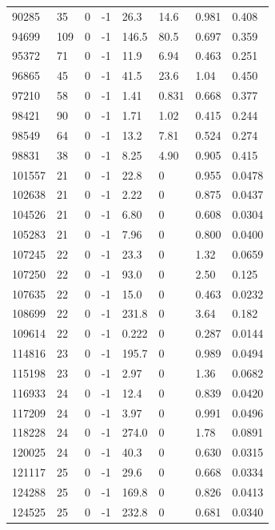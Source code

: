 \documentclass[preview]{standalone}
\begin{document}
{{{\begin{tabular}{L{1.2cm}C{1.2cm} C{0.3cm}C{0.5cm} C{1.4cm}C{1.4cm} C{1.4cm}C{1.4cm}}
  90285  &    35  & 0     & -1 &  26.3  & 14.6  & 0.981 &  0.408   \\ 
  94699  &   109  & 0     & -1 &  146.5  & 80.5  & 0.697 &  0.359   \\ 
  95372  &    71  & 0     & -1 &  11.9  & 6.94  & 0.463 &  0.251   \\ 
  96865  &    45  & 0     & -1 &  41.5  & 23.6  & 1.04 &  0.450   \\ 
  97210  &    58  & 0     & -1 &  1.41  & 0.831  & 0.668 &  0.377   \\ 
  98421  &    90  & 0     & -1 &  1.71  & 1.02  & 0.415 &  0.244   \\ 
  98549  &    64  & 0     & -1 &  13.2  & 7.81  & 0.524 &  0.274   \\ 
  98831  &    38  & 0     & -1 &  8.25  & 4.90  & 0.905 &  0.415   \\ 
  101557  &    21  & 0     & -1 &  22.8  & 0  & 0.955 &  0.0478   \\ 
  102638  &    21  & 0     & -1 &  2.22  & 0  & 0.875 &  0.0437   \\ 
  104526  &    21  & 0     & -1 &  6.80  & 0  & 0.608 &  0.0304   \\ 
  105283  &    21  & 0     & -1 &  7.96  & 0  & 0.800 &  0.0400   \\ 
  107245  &    22  & 0     & -1 &  23.3  & 0  & 1.32 &  0.0659   \\ 
  107250  &    22  & 0     & -1 &  93.0  & 0  & 2.50 &  0.125   \\ 
  107635  &    22  & 0     & -1 &  15.0  & 0  & 0.463 &  0.0232   \\ 
  108699  &    22  & 0     & -1 &  231.8  & 0  & 3.64 &  0.182   \\ 
  109614  &    22  & 0     & -1 &  0.222  & 0  & 0.287 &  0.0144   \\ 
  114816  &    23  & 0     & -1 &  195.7  & 0  & 0.989 &  0.0494   \\ 
  115198  &    23  & 0     & -1 &  2.97  & 0  & 1.36 &  0.0682   \\ 
  116933  &    24  & 0     & -1 &  12.4  & 0  & 0.839 &  0.0420   \\ 
  117209  &    24  & 0     & -1 &  3.97  & 0  & 0.991 &  0.0496   \\ 
  118228  &    24  & 0     & -1 &  274.0  & 0  & 1.78 &  0.0891   \\ 
  120025  &    24  & 0     & -1 &  40.3  & 0  & 0.630 &  0.0315   \\ 
  121117  &    25  & 0     & -1 &  29.6  & 0  & 0.668 &  0.0334   \\ 
  124288  &    25  & 0     & -1 &  169.8  & 0  & 0.826 &  0.0413   \\ 
  124525  &    25  & 0     & -1 &  232.8  & 0  & 0.681 &  0.0340   \\ 
\hline 
\end{tabular} 

}}}
\end{document}
